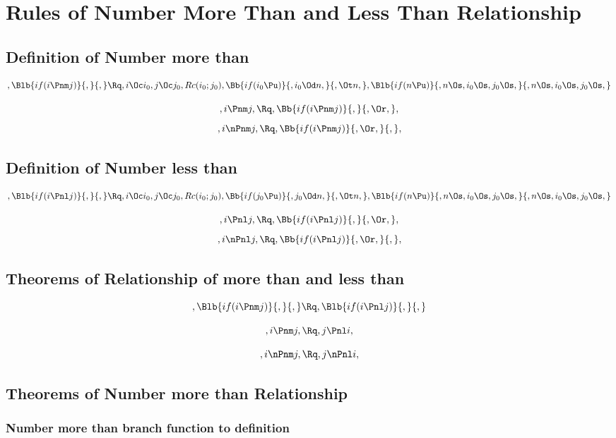 \chapter{Rules of Number More Than and Less Than Relationship}

\section{Definition of Number more than}
\[,\Blb{if(i \Pnm j)}{,}{,} \Rq , i \Oc i_0, j \Oc j_0, Rc(i_0; j_0), \Bb{if(i_0 \Pu)}{,i_0 \Od n, }{, \Ot n, }, \Blb{if(n \Pu)}{,n \Os, i_0 \Os, j_0 \Os, }{, n \Os, i_0 \Os, j_0 \Os, }\]

\bigskip
\bigskip
\[, i \Pnm j, \Rq , \Bb{if(i \Pnm j)}{,}{, \Or,},\]
\bigskip
\bigskip
\[, i \nPnm j, \Rq , \Bb{if(i \Pnm j)}{, \Or,}{,},\]
\bigskip
\bigskip


\section{Definition of Number less than}
\[,\Blb{if(i \Pnl j)}{,}{,} \Rq , i \Oc i_0, j \Oc j_0, Rc(i_0; j_0), \Bb{if(j_0 \Pu)}{,j_0 \Od n, }{, \Ot n, }, \Blb{if(n \Pu)}{,n \Os, i_0 \Os, j_0 \Os, }{, n \Os, i_0 \Os, j_0 \Os, }\]

\bigskip
\bigskip
\[, i \Pnl j, \Rq , \Bb{if(i \Pnl j)}{,}{, \Or,},\]
\bigskip
\bigskip
\[, i \nPnl j, \Rq , \Bb{if(i \Pnl j)}{, \Or,}{,},\]
\bigskip
\bigskip







\bigskip
\bigskip
\section{Theorems of   Relationship of more than and less than}
\[,\Blb{if(i \Pnm j)}{,}{,} \Rq ,\Blb{if(i \Pnl j)}{,}{,}\]
\bigskip
\bigskip

\[, i \Pnm j, \Rq , j \Pnl i,\]

\[, i \nPnm j, \Rq , j \nPnl i,\]





\bigskip
\bigskip
\section{Theorems of  Number more than Relationship}
\subsection{Number more than branch function to definition}


